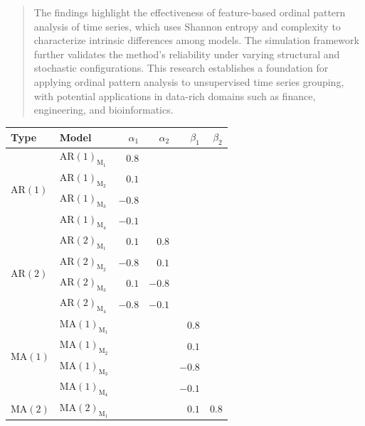 \documentclass[11pt,a4paper]{article}
\begin{document}
\begin{abstract}
The findings highlight the effectiveness of feature-based ordinal pattern analysis of time series, which uses Shannon entropy and complexity to characterize intrinsic differences among models. 
The simulation framework further validates the method’s reliability under varying structural and stochastic configurations. 
This research establishes a foundation for applying ordinal pattern analysis to unsupervised time series grouping, with potential applications in data-rich domains such as finance, engineering, and bioinformatics.

\end{abstract}

\begin{table}[hbt]
	\centering
	\begin{tabular}{llrrrr}
		\toprule
		\textbf{Type} & \textbf{Model} & $\alpha_1$ & $\alpha_2$ & $\beta_1$ & $\beta_2$ \\
		\midrule
		\multirow{4}[2]{*}{$\mathrm{AR}(1)$}      & $\mathrm{AR}(1)_{\textrm{M}_1}$  & $0.8$   &      &      &      \\
		& $\mathrm{AR}(1)_{\textrm{M}_2}$   & $0.1$   &      &      &      \\
		& $\mathrm{AR}(1)_{\textrm{M}_3}$   & $-0.8$  &      &      &      \\
		& $\mathrm{AR}(1)_{\textrm{M}_4}$   & $-0.1$  &      &      &      \\
		\midrule
		\multirow{4}[2]{*}{$\mathrm{AR}(2)$}      & $\mathrm{AR}(2)_{\textrm{M}_1}$   & $0.1$   & $0.8$  &      &      \\
		& $\mathrm{AR}(2)_{\textrm{M}_2}$  & $-0.8$  & $0.1$  &      &      \\
		& $\mathrm{AR}(2)_{\textrm{M}_3}$  & $0.1$   & $-0.8$ &      &      \\
		& $\mathrm{AR}(2)_{\textrm{M}_4}$  & $-0.8$  & $-0.1$ &      &      \\
		\midrule
		\multirow{4}[2]{*}{	$\mathrm{MA}(1)$}      & $\mathrm{MA}(1)_{\textrm{M}_1}$ &       &      & $0.8$  &      \\
		& $\mathrm{MA}(1)_{\textrm{M}_2}$  &       &      & $0.1$  &      \\
		& $\mathrm{MA}(1)_{\textrm{M}_3}$  &       &      & $-0.8$ &      \\
		& $\mathrm{MA}(1)_{\textrm{M}_4}$  &       &      & $-0.1$ &      \\
		\midrule
		\multirow{4}[2]{*}{$\mathrm{MA}(2)$}      & $\mathrm{MA}(2)_{\textrm{M}_1}$  &       &      & $0.1$  & $0.8$  \\

\end{tabular}
\end{table}
\end{document}

